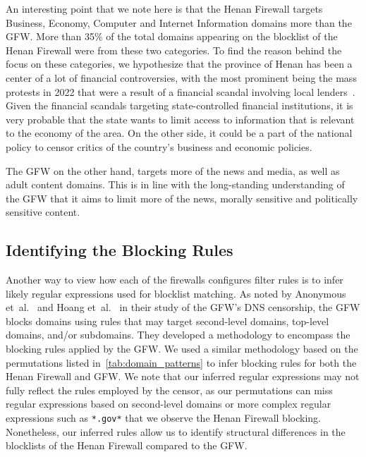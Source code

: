 \documentclass[conference,compsoc]{IEEEtran}
\begin{document}
An interesting point that we note here is that the Henan Firewall targets
Business, Economy, Computer and Internet Information domains more than the GFW.
More than 35\% of the total domains appearing on the blocklist of the Henan
Firewall were from these two categories.
To find the reason behind the focus on these categories,
we hypothesize that the province of Henan has been a center of a lot of financial
controversies, with the most prominent being the mass protests in 2022 that were a
result of a financial scandal involving local lenders~\cite{Security88:online}.
Given the financial scandals targeting state-controlled financial institutions, it is very
probable that the state wants to limit access to information that is relevant
to the economy of the area. On the other side, it could be a part of the
national policy to censor critics of the country's business and economic policies.

The GFW on the other hand, targets more of the news and media, as well as adult content domains.
This is in line with the long-standing understanding of the GFW that
it aims to limit more of the news, morally sensitive and politically sensitive content.


\subsection{Identifying the Blocking Rules}
Another way to view how each of the firewalls configures filter rules is to infer
likely regular expressions used for blocklist matching.
As noted by Anonymous et~al.~\cite[\S 6]{Anonymous2014a}
and Hoang et~al.~\cite[\S 4.1]{Hoang2021a} in their study of the GFW's DNS censorship,
the GFW blocks domains using rules that may target
second-level domains, top-level domains, and/or subdomains. They developed a
methodology to encompass the blocking rules applied by the GFW. We used a
similar methodology based on the permutations listed
in~\autoref{tab:domain_patterns} to infer blocking rules for both the Henan
Firewall and GFW. We note that our inferred regular expressions may not fully
reflect the rules employed by the censor, as our permutations can miss
regular expressions based on second-level domains or more complex regular
expressions such as \texttt{*.gov*} that we observe the Henan Firewall blocking.
Nonetheless, our inferred rules allow us to identify structural differences in
the blocklists of the Henan Firewall compared to the GFW.
\end{document}
